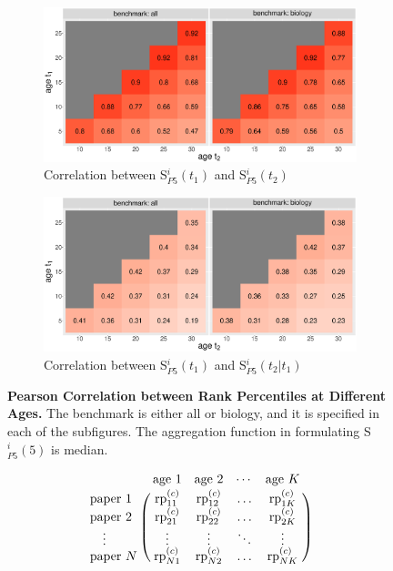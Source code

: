 \begin{refsection}
\begin{figure}[ht!]
    \centering
    \begin{subfigure}[b]{0.8\textwidth}
        \centering
             \includegraphics[width=\textwidth]{figures/pred_power/heatmap_cor_aut_median.eps}
         \caption{Correlation between S$_{P5}^{i}(t_1)$ and S$_{P5}^{i}(t_2)$}
         \label{fig:hm_rp_aut_median}
    \end{subfigure}

    \begin{subfigure}[b]{0.8\textwidth}
        \centering
             \includegraphics[width=\textwidth]{figures/pred_power/heatmap_cor_aut_future_median.eps}
         \caption{Correlation between S$_{P5}^{i}(t_1)$ and S$_{P5}^{i}(t_2 | t_1)$}
         \label{fig:hm_rp_aut_future_median}
    \end{subfigure}
    \caption{{\bf Pearson Correlation between Rank Percentiles at Different Ages.} The benchmark is either all or biology, and it is specified in each of the subfigures. The aggregation function in formulating S$_{P5}^i(5)$ is median.}
    \label{fig:hm_rp_median}
\end{figure}

\iffalse
\begin{equation}
\label{eq:rp_matrix}
\bordermatrix{
    & \text{age 1}     & \text{age 2}     & \cdots & \text{age $K$}     \cr
    \text{paper 1}     & \text{rp}_{11}^{(c)}     & \text{rp}_{12}^{(c)}     & \ldots & \text{rp}_{1 K}^{(c)}      \cr
    \text{paper 2}     & \text{rp}_{21}^{(c)}     & \text{rp}_{22}^{(c)}    & \ldots & \text{rp}_{2 K}^{(c)}     \cr
    \quad \vdots & \vdots & \vdots & \ddots & \vdots \cr
    \text{paper $N$}     & \text{rp}_{N 1}^{(c)}     & \text{rp}_{N 2}^{(c)}     & \ldots  & \text{rp}_{N K}^{(c)}    \cr
}
\end{equation}


\end{refsection}
